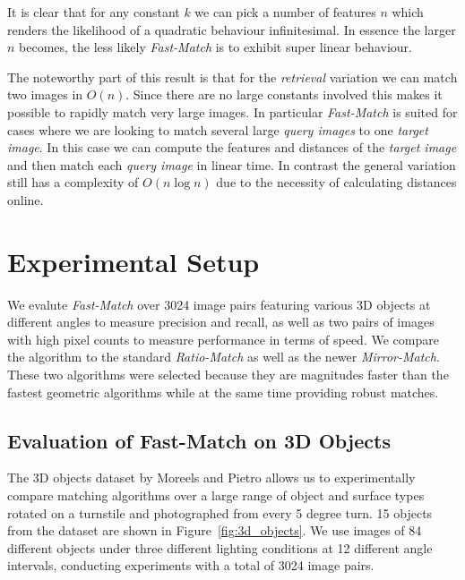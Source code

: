 \documentclass[runningheads]{llncs}
\begin{document}
It is clear that for any constant $k$ we can pick a number of features $n$ which renders the likelihood of a quadratic behaviour infinitesimal. In essence the larger $n$ becomes, the less likely \emph{Fast-Match} is to exhibit super linear behaviour.

The noteworthy part of this result is that for the \emph{retrieval} variation we can match two images in $O(n)$. Since there are no large constants involved this makes it possible to rapidly match very large images. In particular \emph{Fast-Match} is suited for cases where we are looking to match several large \emph{query images} to one \emph{target image}. In this case we can compute the features and distances of the \emph{target image} and then match each \emph{query image} in linear time. In contrast the general variation still has a complexity of $O(n \log n)$ due to the necessity of calculating distances online.

\section{Experimental Setup}
\label{experiments}
We evalute \emph{Fast-Match} over 3024 image pairs featuring various 3D objects at different angles to measure precision and recall, as well as two pairs of images with high pixel counts to measure performance in terms of speed. We compare the algorithm to the standard \emph{Ratio-Match}\cite{lowe2004sift} as well as the newer \emph{Mirror-Match}\cite{arnfred2013mirror}. These two algorithms were selected because they are magnitudes faster than the fastest geometric algorithms while at the same time providing robust matches.

\subsection{Evaluation of Fast-Match on 3D Objects}
\label{3dobjects}

The 3D objects dataset by Moreels and Pietro \cite{moreels2007evaluation} allows us to experimentally compare matching algorithms over a large range of object and surface types rotated on a turnstile and photographed from every 5 degree turn.  15 objects from the dataset are shown in Figure~\ref{fig:3d_objects}.  We use images of 84 different objects under three different lighting conditions at 12 different angle intervals, conducting experiments with a total of 3024 image pairs.  
\end{document}
